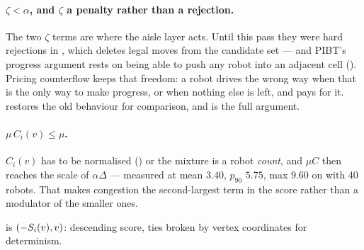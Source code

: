 \paragraph{$\zeta < \alpha$, and $\zeta$ a penalty rather than a rejection.}
The two $\zeta$ terms are where the aisle layer acts. Until this pass they were
hard rejections in , which deletes legal moves from
the candidate set --- and PIBT's progress argument rests on being able to push
any robot into an adjacent cell (). Pricing counterflow
keeps that freedom: a robot drives the wrong way when that is the only way to
make progress, or when nothing else is left, and pays for it.
 restores the old behaviour for comparison,
and  is the full argument.

\paragraph{$\mu\, C_i(v) \leq \mu$.} $C_i(v)$ has to be normalised
() or the mixture is a robot \emph{count}, and
$\mu C$ then reaches the scale of $\alpha \Delta$ --- measured at mean $3.40$,
$p_{90}$ $5.75$, max $9.60$ on  with 40 robots. That
makes congestion the second-largest term in the score rather than a modulator
of the smaller ones.

 is $(-S_i(v), v)$: descending score,
ties broken by vertex coordinates for determinism.

